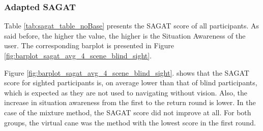 \subsubsection{Adapted SAGAT}
\label{subsubsec:results_adapted_sagat_2}

Table \ref{tab:sagat_table_noBase} presents the SAGAT score of all participants. As said before, the higher the value, the higher is the Situation Awareness of the user. The corresponding barplot is presented in Figure \ref{fig:barplot_sagat_avg_4_scene_blind_sight}.



Figure \ref{fig:barplot_sagat_avg_4_scene_blind_sight}. shows that the SAGAT score for sighted participants is, on average lower than that of blind participants, which is expected as they are not used to navigating without vision. Also, the increase in situation awareness from the first to the return round is lower. In the case of the mixture method, the SAGAT score did not improve at all. For both groups, the virtual cane was the method with the lowest score in the first round.

